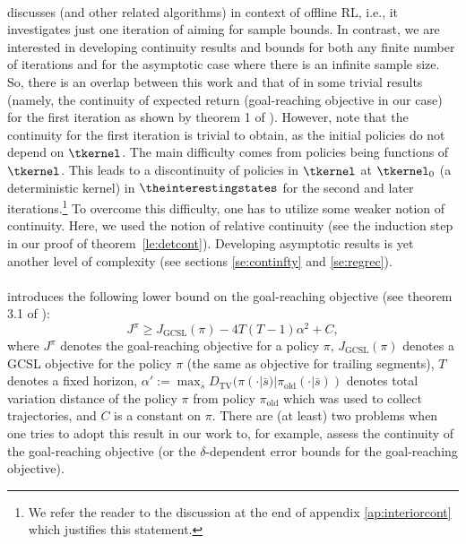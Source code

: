 \paragraph{\citet{brandfonbrener2023does}}
discusses \eUDRL{} (and other related algorithms)
in context of offline RL, i.e.,
it investigates just one iteration of \eUDRL{} aiming for
sample bounds. In contrast, we are interested in developing continuity results and bounds for both any finite number of iterations and for the asymptotic case where there is an infinite sample size.
So, there is an overlap between this work and that of \citet{brandfonbrener2023does} in some trivial results (namely, the continuity of expected return (goal-reaching objective in our case) for the first iteration as shown by theorem 1 of \citet{brandfonbrener2023does}). However, note that the continuity for the
first iteration is trivial to obtain, as the initial policies do not depend on $\tkernel$. The main difficulty
comes from policies being functions of $\tkernel$. This leads to a
discontinuity of policies in $\tkernel$
at $\tkernel_0$ (a deterministic kernel) in $\theinterestingstates$ for the second and later iterations.\footnote{We refer the reader to the discussion at the end of appendix \ref{ap:interiorcont} which justifies this statement.} To overcome this difficulty, one has to utilize some weaker notion of continuity.
Here, we used the notion of relative continuity (see the induction step
in our proof of theorem~\ref{le:detcont}).
Developing asymptotic results is yet another level of complexity (see sections \ref{se:continfty}
and \ref{se:regrec}).

\paragraph{\citet{ghosh2021learning}}
introduces the following lower bound on the goal-reaching objective (see theorem 3.1 of \citet{ghosh2021learning}):
$$
J^{\pi} \geq J_{\mathrm{GCSL}}(\pi) - 4T(T-1)\alpha^2 + C,
$$
where $J^{\pi}$ denotes the goal-reaching objective
for a policy $\pi$, $J_{\mathrm{GCSL}}(\pi)$
denotes a GCSL objective for the policy $\pi$
(the same as \eUDRL{} objective  for trailing segments), $T$ denotes a fixed horizon, $\alpha' := \max_{\bar{s}} D_{\mathrm{TV}}(\pi(\cdot|\bar{s})|\pi_{\mathrm{old}}(\cdot|\bar{s}))$
denotes total variation distance of the policy $\pi$ from
policy $\pi_{\mathrm{old}}$ which was used to collect trajectories, and $C$ is a constant on $\pi$. There are (at least) two problems when
one tries to adopt this result in our work to, for example, assess the continuity of the goal-reaching objective (or the $\delta$-dependent error bounds for the goal-reaching objective).

